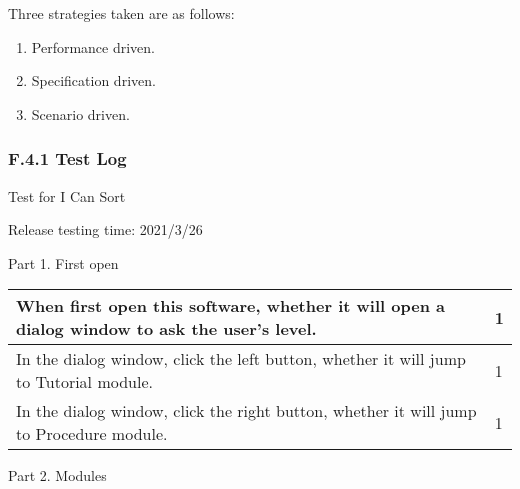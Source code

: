 \documentclass[
]{article}
\begin{document}
Three strategies taken are as follows:

\begin{enumerate}
\def\labelenumi{\arabic{enumi}.}
\item
  Performance driven.
\item
  Specification driven.
\item
  Scenario driven.
\end{enumerate}

\hypertarget{header-n50}{%
\subsubsection{F.4.1 Test Log}\label{header-n50}}

Test for I Can Sort

Release testing time: 2021/3/26

Part 1. First open

\begin{longtable}[]{@{}ll@{}}
\toprule
When first open this software, whether it will open a dialog window to
ask the user's level. & 1 \\
\midrule
\endhead
In the dialog window, click the left button, whether it will jump to
Tutorial module. & 1 \\
In the dialog window, click the right button, whether it will jump to
Procedure module. & 1 \\
\bottomrule
\end{longtable}

Part 2. Modules
\end{document}
